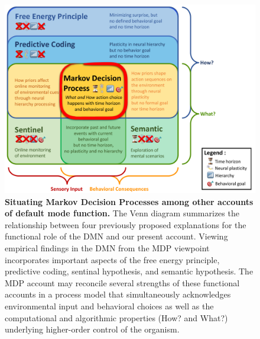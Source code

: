 \documentclass[10pt,letterpaper]{article}
\begin{document}





\begin{figure}[!h]
  \includegraphics[width=1\linewidth]{VennDiagram-2017-09-08.pdf}
  \caption{\textbf{Situating Markov Decision Processes among other accounts of default mode function.}
  The Venn diagram summarizes the relationship between four previously proposed explanations for the functional role of the DMN and our present account. Viewing empirical findings in the DMN from the MDP viewpoint incorporates important aspects of the free energy principle, predictive coding, sentinal hypothesis, and semantic hypothesis.
  The MDP account may reconcile several strengths of these functional accounts in a process model that simultaneously acknowledges environmental input and behavioral choices as well as the computational and algorithmic properties (How? and What?) underlying higher-order control of the organism.}
  \label{fig:VennDiagram}
\end{figure}
\end{document}
